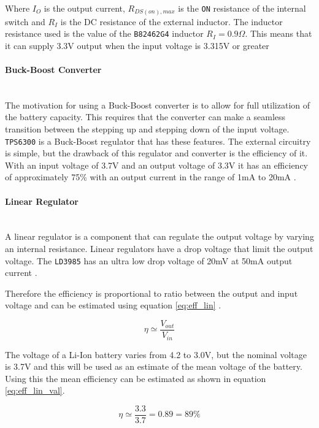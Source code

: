 Where $I_O$ is the output current, $R_{DS(on),max}$ is the \texttt{ON} resistance of the internal switch and $R_I$ is the DC resistance of the external inductor.
The inductor resistance used is the value of the \texttt{B82462G4} inductor \cite{B82462G4} $R_I=0.9\Omega$.
This means that it can supply 3.3V output when the input voltage is 3.315V or greater

\paragraph{Buck-Boost Converter}~\\
The motivation for using a Buck-Boost converter is to allow for full utilization of the battery capacity.
This requires that the converter can make a seamless transition between the stepping up and stepping down of the input voltage. 
\texttt{TPS6300} is a Buck-Boost regulator that has these features.
The external circuitry is simple, but the drawback of this regulator and converter is the efficiency of it.
With an input voltage of 3.7V and an output voltage of 3.3V it has an efficiency of approximately 75\% with an output current in the range of 1mA to 20mA \cite{TPS6300}.

\paragraph{Linear Regulator}~\\
A linear regulator is a component that can regulate the output voltage by varying an internal resistance.
Linear regulators have a drop voltage that limit the output voltage. 
The \texttt{LD3985} has an ultra low drop voltage of 20mV at 50mA output current \cite{LD3985}.

Therefore the efficiency is proportional to ratio between the output and input voltage and can be estimated using equation \ref{eq:eff_lin} \cite{ap_note_140}.

\begin{equation}
	\eta \simeq \frac{V_{out}}{V_{in}}
	\label{eq:eff_lin}
\end{equation}

The voltage of a Li-Ion battery varies from 4.2 to 3.0V, but the nominal voltage is 3.7V and this will be used as an estimate of the mean voltage of the battery.
Using this the mean efficiency can be estimated as shown in equation \ref{eq:eff_lin_val}.

\begin{equation}
	\eta \simeq \frac{3.3}{3.7} = 0.89 = 89\%
	\label{eq:eff_lin_val}
\end{equation}



